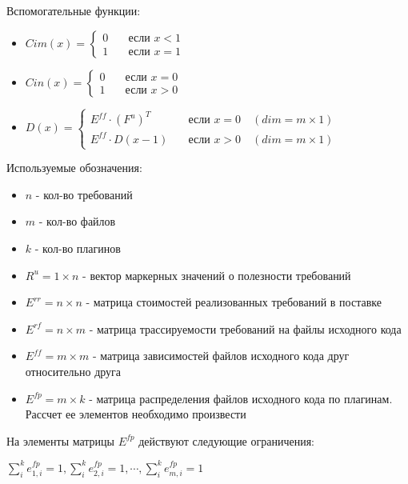 \documentclass{article}
\begin{document}
  Вспомогательные функции:
  \begin{itemize}
    \item[] $
    Cim(x) = 
      \begin{cases}
        0 & \quad \text{если } x < 1 \\
        1 & \quad \text{если } x = 1
      \end{cases}
    $
    \item[] $
      Cin(x) =
      \begin{cases}
        0 & \quad \text{если } x = 0 \\
        1 & \quad \text{если } x > 0
      \end{cases}
    $
    \item[] $
      D(x) =
      \begin{cases}
        E^{ff} \cdot (F^{u})^{T} & \quad \text{если } x = 0 \quad (dim = m \times 1)\\
        E^{ff} \cdot D(x - 1) & \quad \text{если } x > 0 \quad (dim = m \times 1)
      \end{cases}
    $
  \end{itemize}
  Используемые обозначения:
  \begin{itemize}
    \item[] $n$ - кол-во требований
    \item[] $m$ - кол-во файлов
    \item[] $k$ - кол-во плагинов
    \item[] $R^{u} = 1 \times n$ - вектор маркерных значений о полезности требований
    \item[] $E^{rr} = n \times n$ - матрица стоимостей реализованных требований в поставке
    \item[] $E^{rf} = n \times m$ - матрица трассируемости требований на файлы исходного кода
    \item[] $E^{ff} = m \times m$ - матрица зависимостей файлов исходного кода друг относительно друга
    \item[] $E^{fp} = m \times k$ - матрица распределения файлов исходного кода по плагинам. Рассчет ее элементов необходимо произвести
  \end{itemize}
  На элементы матрицы $E^{fp}$ действуют следующие ограничения:
  \begin{center}
    $\displaystyle \sum^{k}_{i}e^{fp}_{1, i} = 1, \sum^{k}_{i}e^{fp}_{2, i} = 1, \cdots, \sum^{k}_{i}e^{fp}_{m, i} = 1$
  \end{center}
\end{document}
